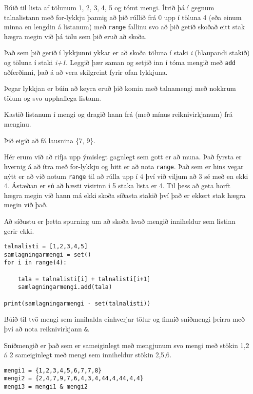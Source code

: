 \begin{exercise}\label{set3}
Búið til lista af tölunum 1, 2, 3, 4, 5 og tómt mengi.
Ítrið þá í gegnum talnalistann með for-lykkju þannig að þið rúllið frá 0 upp í töluna 4 (eða einum minna en lengdin á listanum) með \texttt{range} fallinu svo að þið getið skoðað eitt stak hægra megin við þá tölu sem þið eruð að skoða.

Það sem þið gerið í lykkjunni ykkar er að skoða töluna í staki \textit{i} (hlaupandi stakið) og töluna í staki \textit{i+1}.
Leggið þær saman og setjið inn í tóma mengið með \texttt{add} aðferðinni, það á að vera skilgreint fyrir ofan lykkjuna.

Þegar lykkjan er búin að keyra eruð þið komin með talnamengi með nokkrum tölum og svo upphaflega listann.

Kastið listanum í mengi og dragið hann frá (með mínus reiknivirkjanum) frá menginu.

Þið eigið að fá lausnina \{7, 9\}.
\end{exercise}
\begin{Answer}[ref={set3}]
Hér erum við að rifja upp ýmislegt gagnlegt sem gott er að muna.
Það fyrsta er hvernig á að ítra með for-lykkju og hitt er að nota \texttt{range}.
Það sem er hins vegar nýtt er að við notum \texttt{range} til að rúlla upp í 4 því við viljum að 3 sé með en ekki 4.
Ástæðan er sú að hæsti vísirinn í 5 staka lista er 4.
Til þess að geta horft hægra megin við hann má ekki skoða síðasta stakið því það er ekkert stak hægra megin við það.

Að síðustu er þetta spurning um að skoða hvað mengið inniheldur sem listinn gerir ekki.

	\begin{lstlisting}
talnalisti = [1,2,3,4,5]
samlagningarmengi = set()
for i in range(4):

	tala = talnalisti[i] + talnalisti[i+1]
	samlagningarmengi.add(tala)

print(samlagningarmengi - set(talnalisti))\end{lstlisting}
\end{Answer}

\begin{exercise}\label{set4}
Búið til tvö mengi sem innihalda einhverjar tölur og finnið sniðmengi þeirra með því að nota reiknivirkjann \texttt{\&}.
\end{exercise}
\begin{Answer}[ref={set4}]
	Sniðmengið er það sem er sameiginlegt með mengjunum svo mengi með stökin 1,2 á 2 sameiginlegt með mengi sem inniheldur stökin 2,5,6.
\begin{lstlisting}
mengi1 = {1,2,3,4,5,6,7,7,8}
mengi2 = {2,4,7,9,7,6,4,3,4,44,4,44,4,4}
mengi3 = mengi1 & mengi2\end{lstlisting}
\end{Answer}